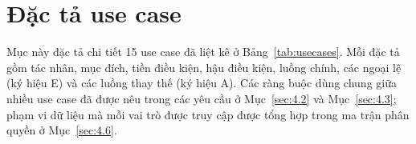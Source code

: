 \section{Đặc tả use case}
\label{sec:4.5}

Mục này đặc tả chi tiết 15 use case đã liệt kê ở Bảng~\ref{tab:usecases}. Mỗi đặc tả gồm tác nhân, mục đích, tiền điều kiện, hậu điều kiện, luồng chính, các ngoại lệ (ký hiệu E) và các luồng thay thế (ký hiệu A). Các ràng buộc dùng chung giữa nhiều use case đã được nêu trong các yêu cầu ở Mục~\ref{sec:4.2} và Mục~\ref{sec:4.3}; phạm vi dữ liệu mà mỗi vai trò được truy cập được tổng hợp trong ma trận phân quyền ở Mục~\ref{sec:4.6}.

